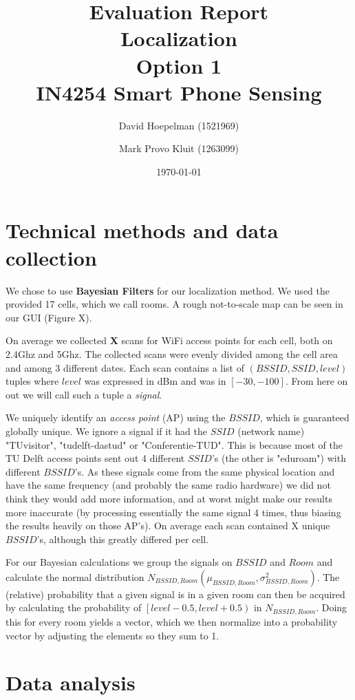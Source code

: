 \documentclass[a4paper,10pt,twoside]{IEEEtran}
\title{\huge{\textbf{Evaluation Report\\Localization\\Option 1}\\IN4254 Smart Phone Sensing}}
\date{\today}
\author{David Hoepelman (1521969) \and Mark Provo Kluit (1263099)}
\begin{document}
\maketitle

\section{Technical methods and data collection}
\label{sec:localization-method}

We chose to use \textbf{Bayesian Filters} for our localization method. We used the provided 17 cells, which we call rooms.
A rough not-to-scale map can be seen in our GUI (Figure X).

On average we collected \textbf{X} scans for WiFi access points for each cell, both on 2.4Ghz and 5Ghz.
The collected scans were evenly divided among the cell area and among 3 different dates. Each scan contains a list of $(BSSID, SSID, level)$ tuples where $level$ was expressed in dBm and was in $[-30,-100]$. From here on out we will call such a tuple a \emph{signal}.

We uniquely identify an \emph{access point} (AP) using the $BSSID$, which is guaranteed globally unique.
We ignore a signal if it had the $SSID$ (network name) "TUvisitor", "tudelft-dastud" or "Conferentie-TUD".
This is because most of the TU Delft access points sent out 4 different $SSID$'s (the other is "eduroam") with different $BSSID$'s.
As these signals come from the same physical location and have the same frequency (and probably the same radio hardware) we did not think they would add more information, and at worst might make our results more inaccurate (by processing essentially the same signal 4 times, thus biasing the results heavily on those AP's).
On average each scan contained X unique $BSSID$'s, although this greatly differed per cell.

For our Bayesian calculations we group the signals on $BSSID$ and $Room$ and calculate the normal distribution $N_{BSSID,Room}(\mu_{BSSID,Room}, \sigma^2_{BSSID,Room})$.
The (relative) probability that a given signal is in a given room can then be acquired by calculating the probability of $\left[level - 0.5, level + 0.5\right)$ in $N_{BSSID,Room}$.
Doing this for every room yields a vector, which we then normalize into a probability vector by adjusting the elements so they sum to 1.




\section{Data analysis}
\label{sec:data}
\end{document}
